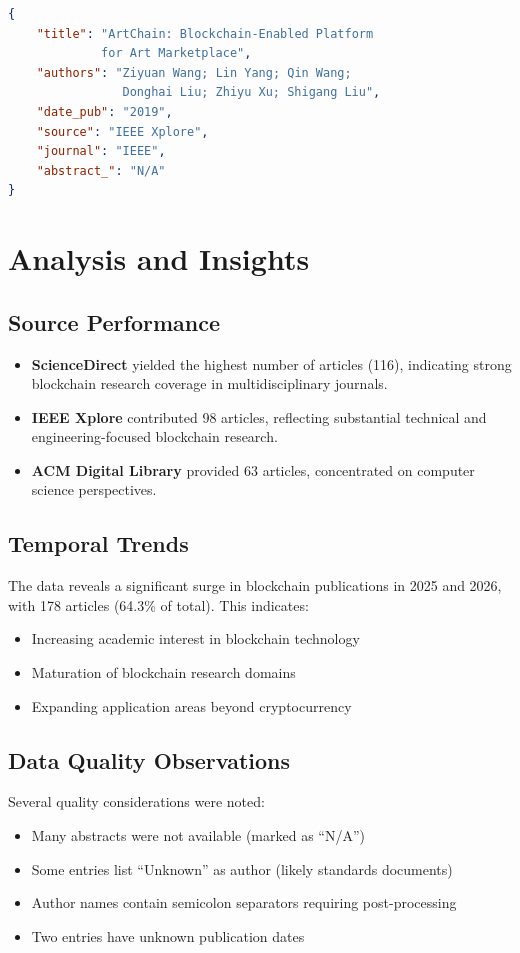 \documentclass[12pt,a4paper]{article}
\begin{document}
\begin{lstlisting}[language=JSON, caption={Example Article Entry}]
{
    "title": "ArtChain: Blockchain-Enabled Platform 
             for Art Marketplace",
    "authors": "Ziyuan Wang; Lin Yang; Qin Wang; 
                Donghai Liu; Zhiyu Xu; Shigang Liu",
    "date_pub": "2019",
    "source": "IEEE Xplore",
    "journal": "IEEE",
    "abstract_": "N/A"
}
\end{lstlisting}

\section{Analysis and Insights}

\subsection{Source Performance}
\begin{itemize}
    \item \textbf{ScienceDirect} yielded the highest number of articles (116), indicating strong blockchain research coverage in multidisciplinary journals.
    \item \textbf{IEEE Xplore} contributed 98 articles, reflecting substantial technical and engineering-focused blockchain research.
    \item \textbf{ACM Digital Library} provided 63 articles, concentrated on computer science perspectives.
\end{itemize}

\subsection{Temporal Trends}
The data reveals a significant surge in blockchain publications in 2025 and 2026, with 178 articles (64.3\% of total). This indicates:
\begin{itemize}
    \item Increasing academic interest in blockchain technology
    \item Maturation of blockchain research domains
    \item Expanding application areas beyond cryptocurrency
\end{itemize}

\subsection{Data Quality Observations}
Several quality considerations were noted:
\begin{itemize}
    \item Many abstracts were not available (marked as ``N/A'')
    \item Some entries list ``Unknown'' as author (likely standards documents)
    \item Author names contain semicolon separators requiring post-processing
    \item Two entries have unknown publication dates
\end{itemize}
\end{document}
